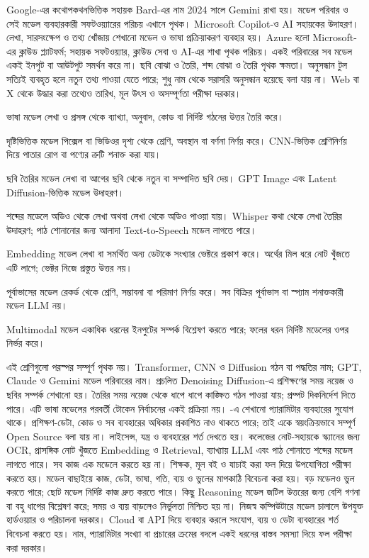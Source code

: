 Google-এর কথোপকথনভিত্তিক সহায়ক Bard-এর নাম 2024 সালে Gemini রাখা হয়। মডেল পরিবার ও সেই মডেল ব্যবহারকারী সফটওয়্যারের পরিচয় এখানে পৃথক।
Microsoft Copilot-ও AI সহায়কের উদাহরণ। লেখা, সারসংক্ষেপ ও তথ্য খোঁজায় শেখানো মডেল ও ভাষা প্রক্রিয়াকরণ ব্যবহার হয়। Azure হলো Microsoft-এর ক্লাউড প্ল্যাটফর্ম; সহায়ক সফটওয়্যার, ক্লাউড সেবা ও AI-এর শাখা পৃথক পরিচয়।
একই পরিবারের সব মডেল একই ইনপুট বা আউটপুট সমর্থন করে না। ছবি বোঝা ও তৈরি, শব্দ বোঝা ও তৈরি পৃথক ক্ষমতা। অনুসন্ধান টুল সত্যিই ব্যবহৃত হলে নতুন তথ্য পাওয়া যেতে পারে; শুধু নাম থেকে সরাসরি অনুসন্ধান হয়েছে বলা যায় না। Web বা X থেকে উদ্ধার করা তথ্যেও তারিখ, মূল উৎস ও অসম্পূর্ণতা পরীক্ষা দরকার।
\begin{compactpoints}
\item ভাষা মডেল লেখা ও প্রসঙ্গ থেকে ব্যাখ্যা, অনুবাদ, কোড বা নির্দিষ্ট গঠনের উত্তর তৈরি করে।
\item দৃষ্টিভিত্তিক মডেল পিক্সেল বা ভিডিওর দৃশ্য থেকে শ্রেণি, অবস্থান বা বর্ণনা নির্ণয় করে। CNN-ভিত্তিক শ্রেণিনির্ণয় দিয়ে পাতার রোগ বা পণ্যের ত্রুটি শনাক্ত করা যায়।
\item ছবি তৈরির মডেল লেখা বা আগের ছবি থেকে নতুন বা সম্পাদিত ছবি দেয়। GPT Image এবং Latent Diffusion-ভিত্তিক মডেল উদাহরণ।
\item শব্দের মডেলে অডিও থেকে লেখা অথবা লেখা থেকে অডিও পাওয়া যায়। Whisper কথা থেকে লেখা তৈরির উদাহরণ; পাঠ শোনানোর জন্য আলাদা Text-to-Speech মডেল লাগতে পারে।
\item Embedding মডেল লেখা বা সমর্থিত অন্য ডেটাকে সংখ্যার ভেক্টরে প্রকাশ করে। অর্থের মিল ধরে নোট খুঁজতে এটি লাগে; ভেক্টর নিজে প্রস্তুত উত্তর নয়।
\item পূর্বাভাসের মডেল রেকর্ড থেকে শ্রেণি, সম্ভাবনা বা পরিমাণ নির্ণয় করে। সব বিক্রির পূর্বাভাস বা স্প্যাম শনাক্তকারী মডেল LLM নয়।
\item Multimodal মডেল একাধিক ধরনের ইনপুটের সম্পর্ক বিশ্লেষণ করতে পারে; ফলের ধরন নির্দিষ্ট মডেলের ওপর নির্ভর করে।
\end{compactpoints}
এই শ্রেণিগুলো পরস্পর সম্পূর্ণ পৃথক নয়। Transformer, CNN ও Diffusion গঠন বা পদ্ধতির নাম; GPT, Claude ও Gemini মডেল পরিবারের নাম। প্রচলিত Denoising Diffusion-এ প্রশিক্ষণের সময় নয়েজ ও ছবির সম্পর্ক শেখানো হয়। তৈরির সময় নয়েজ থেকে ধাপে ধাপে কাঙ্ক্ষিত গঠন পাওয়া যায়; প্রম্পট দিকনির্দেশ দিতে পারে। এটি ভাষা মডেলের পরবর্তী টোকেন নির্বাচনের একই প্রক্রিয়া নয়।
-এ শেখানো প্যারামিটার ব্যবহারের সুযোগ থাকে। প্রশিক্ষণ-ডেটা, কোড ও সব ব্যবহারের অধিকার প্রকাশিত নাও থাকতে পারে; তাই একে স্বয়ংক্রিয়ভাবে সম্পূর্ণ Open Source বলা যায় না। লাইসেন্স, যন্ত্র ও ব্যবহারের শর্ত দেখতে হয়।
কলেজের নোট-সহায়কে স্ক্যানের জন্য OCR, প্রাসঙ্গিক নোট খুঁজতে Embedding ও Retrieval, ব্যাখ্যায় LLM এবং পাঠ শোনাতে শব্দের মডেল লাগতে পারে। সব কাজ এক মডেলে করতে হয় না। শিক্ষক, মূল বই ও যাচাই করা ফল দিয়ে উপযোগিতা পরীক্ষা করতে হয়।
মডেল বাছাইয়ে কাজ, ডেটা, ভাষা, গতি, ব্যয় ও ভুলের মাপকাঠি বিবেচনা করা হয়। বড় মডেলও ভুল করতে পারে; ছোট মডেল নির্দিষ্ট কাজ দ্রুত করতে পারে। কিছু Reasoning মডেল জটিল উত্তরের জন্য বেশি গণনা বা বহু ধাপের বিশ্লেষণ করে; সময় ও ব্যয় বাড়লেও নির্ভুলতা নিশ্চিত হয় না।
নিজস্ব কম্পিউটারে মডেল চালালে উপযুক্ত হার্ডওয়্যার ও পরিচালনা দরকার। Cloud বা API দিয়ে ব্যবহার করলে সংযোগ, ব্যয় ও ডেটা ব্যবহারের শর্ত বিবেচনা করতে হয়। নাম, প্যারামিটার সংখ্যা বা প্রচারের ক্রমের বদলে একই ধরনের বাস্তব সমস্যা দিয়ে ফল পরীক্ষা করা দরকার।
